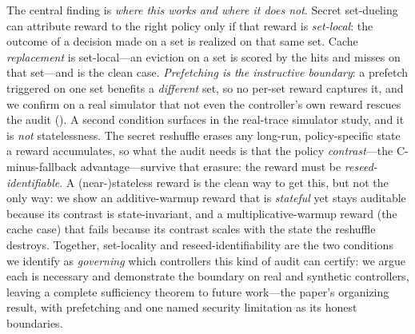\documentclass{article}
\begin{document}
The central finding is \emph{where this works and where it does not}. Secret
set-dueling can attribute reward to the right policy only if that reward is
\emph{set-local}: the outcome of a decision made on a set is realized on that same
set. Cache \emph{replacement} is set-local---an eviction on a set is scored by the
hits and misses on that set---and is the clean case. \emph{Prefetching is the
instructive boundary}: a prefetch triggered on one set benefits a \emph{different}
set, so no per-set reward captures it, and we confirm on a real simulator that not
even the controller's own reward rescues the audit (). A
second condition surfaces in the real-trace simulator study, and it is \emph{not} statelessness. The
secret reshuffle erases any long-run, policy-specific state a reward accumulates, so
what the audit needs is that the policy \emph{contrast}---the C-minus-fallback
advantage---survive that erasure: the reward must be \emph{reseed-identifiable}. A
(near-)stateless reward is the clean way to get this, but not the only way: we show
an additive-warmup reward that is \emph{stateful} yet stays auditable because its
contrast is state-invariant, and a multiplicative-warmup reward (the cache case) that
fails because its contrast scales with the state the reshuffle destroys. Together,
set-locality and reseed-identifiability are the two conditions we identify as \emph{governing}
which controllers this kind of audit can certify: we argue each is necessary and demonstrate the
boundary on real and synthetic controllers, leaving a complete sufficiency theorem to future
work---the paper's organizing result, with prefetching and one named security limitation as its
honest boundaries.
\end{document}

